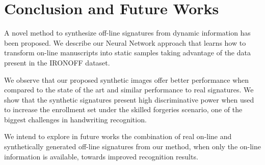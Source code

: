 
\chapter{Conclusion and Future Works}


A novel method to synthesize off-line signatures
from dynamic information has been proposed. We describe our Neural Network approach that learns how to transform on-line manuscripts into static samples taking advantage of the data present in the IRONOFF dataset. 

We observe that our proposed synthetic images offer better performance when compared to the state of the art and similar performance to real signatures. We show that the synthetic signatures present high discriminative power when used to increase the enrollment set under the skilled forgeries scenario, one of the biggest challenges in handwriting recognition. 

We intend to explore in future works the combination of real on-line and
synthetically generated off-line signatures from our method, when only the on-line information is available, towards improved recognition results.
